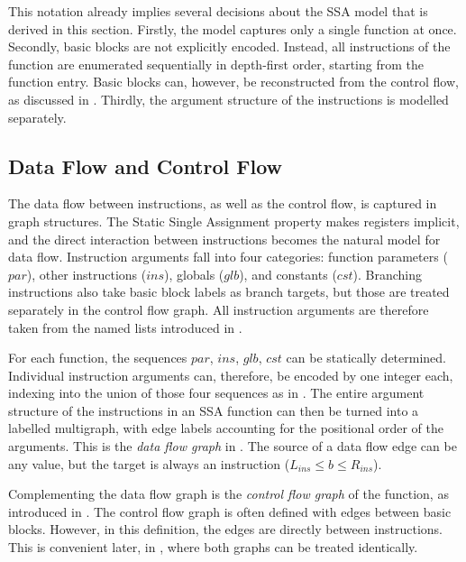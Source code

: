     This notation already implies several decisions about the SSA model that is
    derived in this section.
    Firstly, the model captures only a single function at once.
    Secondly, basic blocks are not explicitly encoded.
    Instead, all instructions of the function are enumerated sequentially in
    depth-first order, starting from the function entry.
    Basic blocks can, however, be reconstructed from the control flow, as
    discussed in .
    Thirdly, the argument structure of the instructions is modelled separately.

\subsection{Data Flow and Control Flow}
\label{sec:derivingamodel}

    The data flow between instructions, as well as the control flow, is captured
    in graph structures.
    The Static Single Assignment property makes registers implicit, and the
    direct interaction between instructions becomes the natural model for data
    flow.
    Instruction arguments fall into four categories: function parameters ($par$),
    other instructions ($ins$), globals ($glb$), and constants ($cst$).
    Branching instructions also take basic block labels as branch targets,
    but those are treated separately in the control flow graph.
    All instruction arguments are therefore taken from the named lists
    introduced in .

    For each function, the sequences $par$, $ins$, $glb$, $cst$ can be
    statically determined.
    Individual instruction arguments can, therefore, be encoded by one integer
    each, indexing into the union of those four sequences as in
    .
    The entire argument structure of the instructions in an SSA
    function can then be turned into a labelled multigraph, with edge labels
    accounting for the positional order of the arguments.
    This is the {\it data flow graph} in .
    The source of a data flow edge can be any value, but the target is
    always an instruction ($L_{ins}\leq b\leq R_{ins}$).

    Complementing the data flow graph is the {\em control flow graph} of the
    function, as introduced in .
    The control flow graph is often defined with edges between basic blocks.
    However, in this definition, the edges are directly between instructions.
    This is convenient later, in
    , where both graphs
    can be treated identically.

